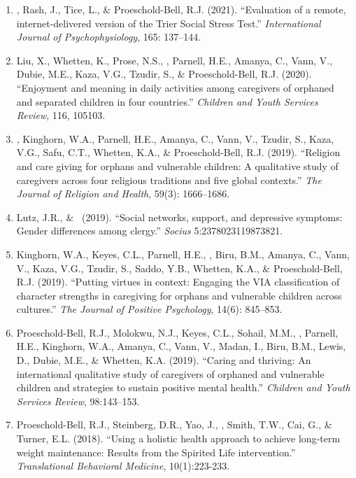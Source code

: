 \begin{enumerate}
\item \Eagle, Rash, J., Tice, L., \& Proeschold-Bell, R.J. (2021). ``Evaluation of a remote, internet-delivered version of the Trier Social Stress Test.'' \textit{International Journal of Psychophysiology}, 165: 137--144. 

\item Liu, X., Whetten, K., Prose, N.S., \Eagle, Parnell, H.E., Amanya, C., Vann, V., Dubie, M.E., Kaza, V.G., Tzudir, S., \& Proeschold-Bell, R.J. (2020). ``Enjoyment and meaning in daily activities among caregivers of orphaned and separated children in four countries.'' \emph{Children and Youth Services Review}, 116, 105103. 

\item \Eagle, Kinghorn, W.A., Parnell, H.E., Amanya, C., Vann, V., Tzudir, S., Kaza, V.G., Safu, C.T., Whetten, K.A., \& Proeschold-Bell, R.J. (2019). ``Religion and care giving for orphans and vulnerable children: A qualitative study of caregivers across four religious traditions and five global contexts.'' \emph{The Journal of Religion and Health}, 59(3): 1666--1686. 

\item Lutz, J.R., \& \Eagle\CS\ (2019). ``Social networks, support, and depressive symptoms: Gender differences among clergy.'' \emph{Socius} 5:2378023119873821. 

\item Kinghorn, W.A., Keyes, C.L., Parnell, H.E., \Eagle, Biru, B.M., Amanya, C., Vann, V., Kaza, V.G., Tzudir, S., Saddo, Y.B., Whetten, K.A., \& Proeschold-Bell, R.J. (2019). ``Putting virtues in context: Engaging the VIA classification of character strengths in caregiving for orphans and vulnerable children across cultures.'' \emph{The Journal of Positive Psychology}, 14(6): 845--853. 

\item Proeschold-Bell, R.J., Molokwu, N.J., Keyes, C.L., Sohail, M.M., \Eagle, Parnell, H.E., Kinghorn, W.A., Amanya, C., Vann, V., Madan, I., Biru, B.M., Lewis, D., Dubie, M.E., \& Whetten, K.A. (2019). ``Caring and thriving: An international qualitative study of caregivers of orphaned and vulnerable children and strategies to sustain positive mental health.''  \emph{Children and Youth Services Review}, 98:143--153.  

\item Proeschold-Bell, R.J., Steinberg, D.R., Yao, J., \Eagle, Smith, T.W., Cai, G., \& Turner, E.L. (2018). ``Using a holistic health approach to achieve long-term weight maintenance: Results from the Spirited Life intervention.'' \emph{Translational Behavioral Medicine}, 10(1):223-233. 


\end{enumerate}
